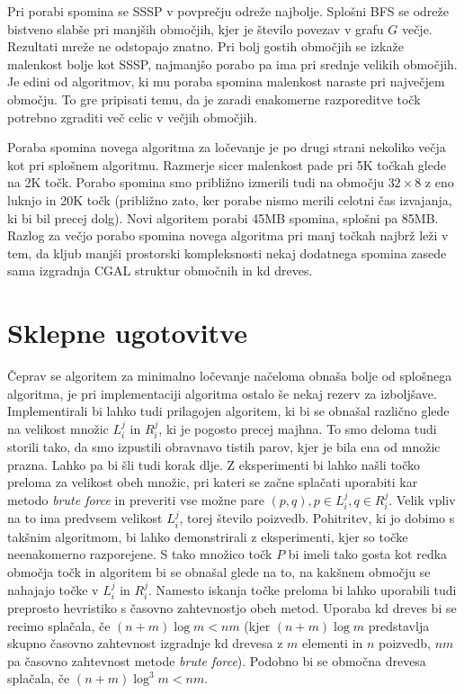 \documentclass[a4paper, 12pt]{book}
\begin{document}
Pri porabi spomina se SSSP v povprečju odreže najbolje. Splošni BFS se odreže bistveno slabše pri manjših območjih, kjer je število povezav v grafu $G$ večje. Rezultati mreže ne odstopajo znatno. Pri bolj gostih območjih se izkaže malenkost bolje kot SSSP, najmanjšo porabo pa ima pri srednje velikih območjih. Je edini od algoritmov, ki mu poraba spomina malenkost naraste pri največjem območju. To gre pripisati temu, da je zaradi enakomerne razporeditve točk potrebno zgraditi več celic v večjih območjih. 

Poraba spomina novega algoritma za ločevanje je po drugi strani nekoliko večja kot pri splošnem algoritmu. Razmerje sicer malenkost pade pri 5K točkah glede na 2K točk. Porabo spomina smo približno izmerili tudi na območju $32\times 8$ z eno luknjo in 20K točk (približno zato, ker porabe nismo merili celotni čas izvajanja, ki bi bil precej dolg). Novi algoritem porabi 45MB spomina, splošni pa 85MB. Razlog za večjo porabo spomina novega algoritma pri manj točkah najbrž leži v tem, da kljub manjši prostorski kompleksnosti nekaj dodatnega spomina zasede sama izgradnja CGAL struktur območnih in kd dreves. 
\chapter{Sklepne ugotovitve}
\label{ch4}

Čeprav se algoritem za minimalno ločevanje načeloma obnaša bolje od splo\-šne\-ga algoritma, je pri implementaciji algoritma ostalo še nekaj rezerv za izboljšave. Implementirali bi lahko tudi prilagojen algoritem, ki bi se obnašal različno glede na velikost množic $L_i^j$ in $R_i^j$, ki je pogosto precej majhna. To smo deloma tudi storili tako, da smo izpustili obravnavo  tistih parov, kjer je bila ena od množic prazna. Lahko pa bi šli tudi korak dlje. Z eksperimenti bi lahko našli točko preloma za velikost obeh množic, pri kateri se začne splačati uporabiti kar metodo \textit{brute force} in preveriti vse možne pare $(p,q), p\in L_i^j, q\in R_i^j$. Velik vpliv na to ima predvsem velikost $L_i^j$, torej število poizvedb. Pohitritev, ki jo dobimo s takšnim algoritmom, bi lahko demonstrirali z eksperimenti, kjer so točke neenakomerno razporejene. S tako množico točk $P$ bi imeli tako gosta kot redka območja točk in algoritem bi se obnašal glede na to, na kakšnem območju se nahajajo točke v $L_i^j$ in $R_i^j$. Namesto iskanja točke preloma bi lahko uporabili tudi preprosto hevristiko s časovno zahtevnostjo obeh metod. Uporaba kd dreves bi se recimo splačala, če $(n+m)\log m < nm$ (kjer $(n+m)\log m$ predstavlja skupno časovno zahtevnost izgradnje kd drevesa z $m$ elementi in $n$ poizvedb, $nm$ pa časovno zahtevnost metode \textit{brute force}). Podobno bi se območna drevesa splačala, če $(n+m)\log^3 m < nm$.
\end{document}
